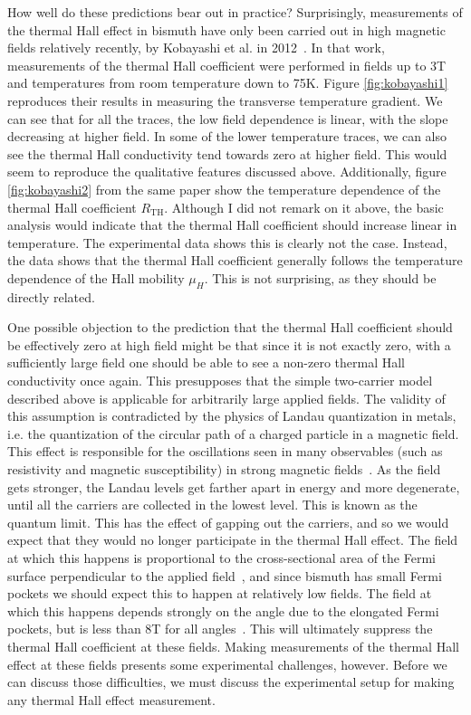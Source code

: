 \documentclass{thesis-umich}
\begin{document}
How well do these predictions bear out in practice? Surprisingly, measurements of the thermal Hall effect in bismuth have only been carried out in high magnetic fields relatively recently, by Kobayashi et al. in 2012~\cite{Kobayashi2012}. In that work, measurements of the thermal Hall coefficient were performed in fields up to 3T and temperatures from room temperature down to 75K. Figure \ref{fig:kobayashi1} reproduces their results in measuring the transverse temperature gradient. We can see that for all the traces, the low field dependence is linear, with the slope decreasing at higher field. In some of the lower temperature traces, we can also see the thermal Hall conductivity tend towards zero at higher field. This would seem to reproduce the qualitative features discussed above. Additionally, figure \ref{fig:kobayashi2} from the same paper show the temperature dependence of the thermal Hall coefficient $R_{\mathrm{TH}}$. Although I did not remark on it above, the basic analysis would indicate that the thermal Hall coefficient should increase linear in temperature. The experimental data shows this is clearly not the case. Instead, the data shows that the thermal Hall coefficient generally follows the temperature dependence of the Hall mobility $\mu_H$. This is not surprising, as they should be directly related.

One possible objection to the prediction that the thermal Hall coefficient should be effectively zero at high field might be that since it is not exactly zero, with a sufficiently large field one should be able to see a non-zero thermal Hall conductivity once again. This presupposes that the simple two-carrier model described above is applicable for arbitrarily large applied fields. The validity of this assumption is contradicted by the physics of Landau quantization in metals, i.e. the quantization of the circular path of a charged particle in a magnetic field. This effect is responsible for the oscillations seen in many observables (such as resistivity and magnetic susceptibility) in strong magnetic fields~\cite{Shoenberg}. As the field gets stronger, the Landau levels get farther apart in energy and more degenerate, until all the carriers are collected in the lowest level. This is known as the quantum limit. This has the effect of gapping out the carriers, and so we would expect that they would no longer participate in the thermal Hall effect. The field at which this happens is proportional to the cross-sectional area of the Fermi surface perpendicular to the applied field~\cite{Shoenberg}, and since bismuth has small Fermi pockets we should expect this to happen at relatively low fields. The field at which this happens depends strongly on the angle due to the elongated Fermi pockets, but is less than 8T for all angles~\cite{Li2008}. This will ultimately suppress the thermal Hall coefficient at these fields. Making measurements of the thermal Hall effect at these fields presents some experimental challenges, however. Before we can discuss those difficulties, we must discuss the experimental setup for making any thermal Hall effect measurement.  
\end{document}
